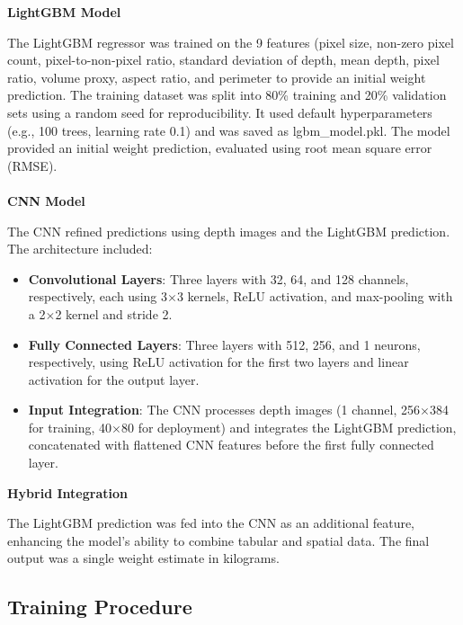 {\noindent \textbf{LightGBM Model}

The LightGBM regressor was trained on the 9 features (pixel size, non-zero pixel count, pixel-to-non-pixel ratio, standard deviation of depth, mean depth, pixel ratio, volume proxy, aspect ratio, and perimeter to provide an initial weight prediction. The training dataset was split into 80\% training and 20\% validation sets using a random seed for reproducibility. It used default hyperparameters (e.g., 100 trees, learning rate 0.1) and was saved as lgbm\_model.pkl. The model provided an initial weight prediction, evaluated using root mean square error (RMSE).
\\
\\
\noindent \textbf{CNN Model}

The CNN refined predictions using depth images and the LightGBM prediction. The architecture included:
\begin{itemize}
	\item \textbf{Convolutional Layers}: Three layers with 32, 64, and 128 channels, respectively, each using 3$\times$3 kernels, ReLU activation, and max-pooling with a 2$\times$2 kernel and stride 2.
	\item \textbf{Fully Connected Layers}: Three layers with 512, 256, and 1 neurons, respectively, using ReLU activation for the first two layers and linear activation for the output layer.
	\item \textbf{Input Integration}: The CNN processes depth images (1 channel, 256$\times$384 for training, 40$\times$80 for deployment) and integrates the LightGBM prediction, concatenated with flattened CNN features before the first fully connected layer.
\end{itemize}

\noindent \textbf{Hybrid Integration}

The LightGBM prediction was fed into the CNN as an additional feature, enhancing the model’s ability to combine tabular and spatial data. The final output was a single weight estimate in kilograms.

\subsection{Training Procedure}

}

